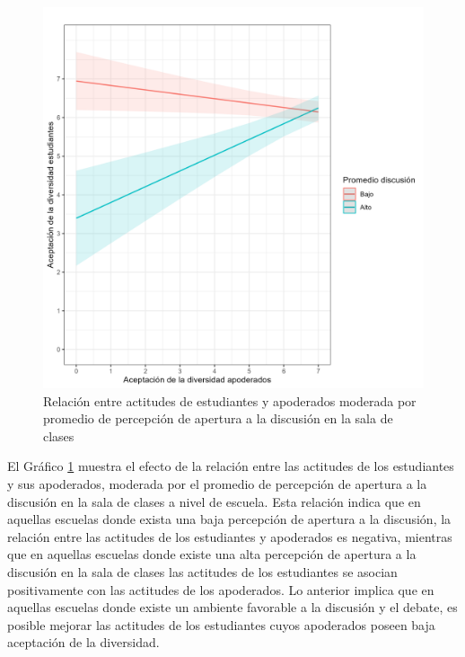 \documentclass[12pt,twoside]{templates/facsothesis}
\begin{document}
\begin{figure}[!ht]

{\centering \includegraphics[width=1\linewidth,]{IPO/output/graphs/interac} 

}

\caption{Relación entre actitudes de estudiantes y apoderados moderada por promedio de percepción de apertura a la discusión en la sala de clases}\label{fig:graph-interact}
\end{figure}

El Gráfico \ref{fig:graph-interact} muestra el efecto de la relación entre las actitudes de los estudiantes y sus apoderados, moderada por el promedio de percepción de apertura a la discusión en la sala de clases a nivel de escuela. Esta relación indica que en aquellas escuelas donde exista una baja percepción de apertura a la discusión, la relación entre las actitudes de los estudiantes y apoderados es negativa, mientras que en aquellas escuelas donde existe una alta percepción de apertura a la discusión en la sala de clases las actitudes de los estudiantes se asocian positivamente con las actitudes de los apoderados. Lo anterior implica que en aquellas escuelas donde existe un ambiente favorable a la discusión y el debate, es posible mejorar las actitudes de los estudiantes cuyos apoderados poseen baja aceptación de la diversidad.
\end{document}
